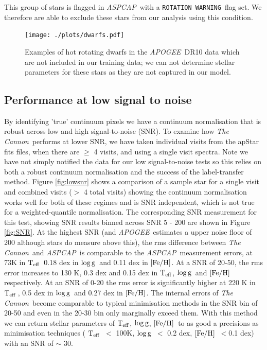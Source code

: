 \documentclass[12pt, preprint]{aastex}
\newcommand{\teff}{\mbox{$\rm T_{eff}$}}
\newcommand{\feh}{\mbox{$\rm [Fe/H]$}}
\newcommand{\logg}{\mbox{$\rm \log g$}}
\newcommand{\tc}{\textsl{The Cannon}}
\newcommand{\apogee}{\textsl{APOGEE}}
\newcommand{\aspcap}{\textsl{ASPCAP}}
\newcommand{\rotwarn}{\texttt{ROTATION WARNING}}
\begin{document}
This group of stars is flagged in \aspcap\ with a \rotwarn\ flag set. We therefore are able to exclude these stars from our analysis using this condition. 
 
 \begin{figure}[h]
 \texttt{[image: ./plots/dwarfs.pdf]}
  \caption{Examples of hot rotating dwarfs in the \apogee\ DR10 data which are not included in our training data; we can not determine stellar parameters for these stars as they are not captured in our model.}
\label{fig:dwarfs}
\end{figure}


 \subsection{Performance at low signal to noise}

By identifying 'true' continuum pixels we have a continuum normalisation that is robust across low and high signal-to-noise (SNR). To examine how \tc\ performs at lower SNR, we have taken individual visits from the apStar fits files, when there are $\ge$ 4 visits, and using a single visit spectra. Note we have not simply notified the data for our low signal-to-noise tests so this relies on both a robust continuum normalisation and the success of the label-transfer method. Figure \ref{fig:lowsnr} shows a comparison of a sample star for a single visit and combined visits ($>$ 4 total visits) showing the continuum normalisation works well for both of these regimes and is SNR independent, which is not true for a weighted-quantile normalisation. The corresponding SNR measurement for this test,  showing SNR results binned  across SNR 5 - 200 are shown in Figure \ref{fig:SNR}.  At the highest SNR (and \apogee\ estimates a upper noise floor of 200 although stars do measure above this), the rms difference between \tc\ and \aspcap\ is comparable to the \aspcap\ measurement errors, at 73K in \teff\, 0.18 dex in \logg\ and 0.11 dex in \feh.  At a SNR of 20-50, the rms error increases to 130 K, 0.3 dex and 0.15 dex in \teff, \logg\ and \feh\, respectively. At an SNR of 0-20 the rms error is significantly higher at 220 K in \teff\,, 0.5 dex in \logg\ and 0.27 dex in \feh. The internal errors of \tc\ become comparable to typical minimisation methods in the SNR bin of 20-50 and even in the 20-30 bin only marginally exceed them. With this method we can return stellar parameters of \teff, \logg, \feh\ to as good a precisions as minimisation techniques ( \teff\ $<$ 100K, \logg\ $<$ 0.2 dex, \feh\ $< $0.1 dex) with an SNR of $\sim$ 30. 
 
\end{document}
